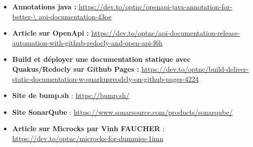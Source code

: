 \documentclass[11pt]{article}
\begin{document}
		\begin{itemize}
			\item \textbf{Annotations java :} \url{https://dev.to/optnc/openapi-java-annotation-for-better-\
				api-documentation-43oe}
			\item \textbf{Article sur OpenApi :} \url{https://dev.to/optnc/api-documentation-release-automation-with-github-redocly-and-open-api-f6h}
			\item \textbf{Build et déployer une documentation statique avec Quakus/Redocly sur Github Pages :} \url{https://dev.to/optnc/build-deliver-static-documentation-w-quarkusreodcly-on-github-pages-4224}
			\item \textbf {Site de bump.sh} : \url{https://bump.sh/}
			\item \textbf{Site SonarQube} : \url{https://www.sonarsource.com/products/sonarqube/}
			\item \textbf{Article sur Microcks par Vinh FAUCHER} : \url{https://dev.to/optnc/microcks-for-dummies-1imn}
			
		\end{itemize}
		
	
\end{document}
